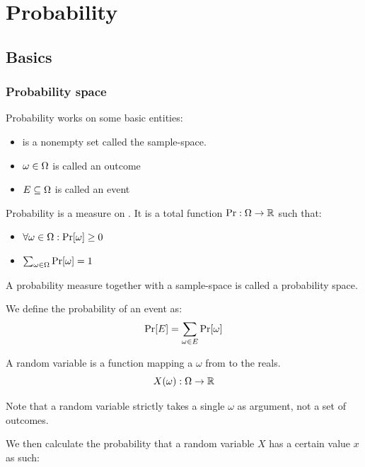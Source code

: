 \section{Probability}

\subsection{Basics}

\subsubsection{Probability space}

Probability works on some basic entities:
\begin{itemize}
    \item \samplespace is a nonempty set called the sample-space. 
    \item $\omega \in \Omega$ is called an outcome
    \item $E \subseteq \Omega$ is called an event
\end{itemize}


\begin{definition}[Probability]
    Probability is a measure on \samplespace. It is a total function $ \operatorname{Pr}: \Omega \to \mathbb{R} $ such that:
    \begin{itemize}
        \item $ \forall \omega \in \Omega : \operatorname{Pr}[\omega] \geq 0 $
        \item $ \sum_{\omega \in \Omega} \operatorname{Pr}[\omega] = 1 $
    \end{itemize}
\end{definition}

A probability measure together with a sample-space is called a probability space. 


We define the probability of an event as: 
$$ \operatorname{Pr}[E] = \sum_{\omega \in E} \operatorname{Pr}[\omega] $$

\begin{definition}
    A random variable is a function mapping a $\omega$ from \samplespace  to the reals. 
    $$ X(\omega) : \Omega \to \mathbb{R} $$
\end{definition}
Note that a random variable strictly takes a single $\omega$ as argument, not a set of outcomes. 

We then calculate the probability that a random variable $X$ has a certain value $x$ as such: 

